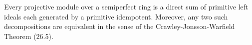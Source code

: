 Every projective module over a semiperfect ring is a direct sum of primitive left ideals each generated by a primitive idempotent. Moreover, any two such decompositions are equivalent in the sense of the Crawley-Jonsson-Warfield Theorem (26.5).
